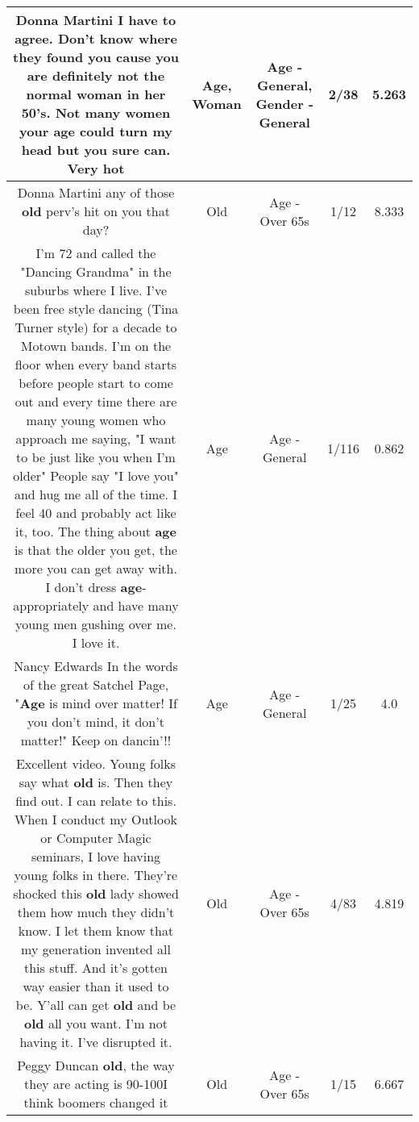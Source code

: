 \documentclass[11pt]{article}
\newlength\mylength
\begin{document}
\begin{center}
\begin{longtable}{|C{.65\mylength}|C{.30\mylength}|C{.12\mylength}|C{.12\mylength}|C{.12\mylength}|}
  \small Donna Martini I have to agree. Don't know where they found you cause you are definitely not the normal \textbf{woman} in her 50's. Not many women your \textbf{age} could turn my head but you sure can. Very hot\normalsize   & Age, Woman & Age - General, Gender - General & 2/38 & 5.263 \\  \hline
  \small Donna Martini any of those \textbf{old} perv's hit on you that day?\normalsize   & Old & Age - Over 65s & 1/12 & 8.333 \\  \hline
  \small I'm 72 and called the "Dancing Grandma" in the suburbs where I live.  I've been free style dancing (Tina Turner style) for a decade to Motown bands. I'm on the floor when every band starts before people start to come out and every time there are many young women who approach me saying, "I want to be just like you when I'm older" People say "I love you" and hug me all of the time. I feel 40 and probably act like it, too.  The thing about \textbf{age} is that the older you get, the more you can get away with. I don't dress \textbf{age}-appropriately and have many young men gushing over me.  I love it.\normalsize   & Age & Age - General & 1/116 & 0.862 \\  \hline
  \small Nancy Edwards In the words of the great Satchel Page, "\textbf{Age} is mind over matter! If you don't mind, it don't matter!" Keep on dancin'!!\normalsize   & Age & Age - General & 1/25 & 4.0 \\  \hline
  \small Excellent video. Young folks say what \textbf{old} is. Then they find out. I can relate to this. When I conduct my Outlook or Computer Magic seminars, I love having young folks in there. They're shocked this \textbf{old} lady showed them how much they didn't know. I let them know that my generation invented all this stuff. And it's gotten way easier than it used to be. Y'all can get \textbf{old} and be \textbf{old} all you want. I'm not having it. I've disrupted it.\normalsize   & Old & Age - Over 65s & 4/83 & 4.819 \\  \hline
  \small Peggy Duncan \textbf{old}, the way they are acting is 90-100I think boomers changed it\normalsize   & Old & Age - Over 65s & 1/15 & 6.667 \\  \hline

\end{longtable}
\end{center}
\end{document}
